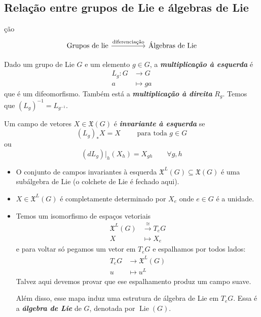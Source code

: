 \subsection{Rela\c c\~ao entre grupos de Lie e álgebras de Lie}
\c c\~ao
\[\begin{tikzcd}
	\text{Grupos de lie}\arrow[rr,"\text{diferenciação}" ]&&\text{\'Algebras de Lie}  
\end{tikzcd}\]

\begin{defn}
	Dado um grupo de Lie $G$ e um elemento $g\in G$, a \textit{\textbf{multiplica\c c\~ao à esquerda}} \'e
	\begin{align*}
		L_g: G &\longrightarrow G \\
		a &\longmapsto ga
	\end{align*}
que \'e um difeomorfismo. Tamb\'em est\'a a \textit{\textbf{multiplica\c c\~ao à direita}} $R_g$. Temos que  $(L_g)^{-1}=L_{g^{-1}}$.
\end{defn}

\begin{defn}
	Um campo de vetores $X\in\mathfrak{X}(G)$ \'e \textit{\textbf{invariante à esquerda}} se  \[(L_{g})_*X=X \qquad \text{ para toda }g \in G\]
	ou
	\[(dL_g)|_{h}(X_h)=X_{gh}\qquad \forall g,h\]
\end{defn}

\begin{remark}\leavevmode 
	\begin{itemize}
	\item O conjunto de campos invariantes à esquerda $\mathfrak{X}^L(G) \subseteq \mathfrak{X}(G)$ \'e uma sub\'algebra de Lie (o colchete de Lie \'e fechado aqui).
	\item $X\in\mathfrak{X}^L(G)$ \'e completamente determinado por  $X_e$ onde  $e\in G$ \'e a unidade.

	\item Temos um isomorfismo de espaços vetoriais
		\begin{align*}
			\mathfrak{X}^L(G)  &\overset{ \cong }{\longrightarrow}T_eG\\
			X &\longmapsto X_e
		\end{align*}
		e para voltar s\'o pegamos um vetor em  $T_eG$ e espalhamos por todos lados:
\begin{align*}
	T_eG  &\longrightarrow \mathfrak{X}^L(G) \\
	u &\longmapsto u^L
\end{align*}
		Talvez aqui devemos provar que ese espalhamento produz um campo suave.

		Al\'em disso, esse mapa induz uma estrutura de \'algebra de Lie em $T_eG$. Essa  \'e a \textit{\textbf{\'algebra de Lie}} de $G$, denotada por  $\operatorname{Lie}(G)$.
			\end{itemize}
\end{remark}

